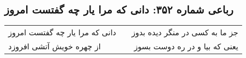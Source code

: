 \begin{center}
\section*{رباعی شماره ۳۵۲: دانی که مرا یار چه گفتست امروز}
\label{sec:sh352}
\begin{longtable}{l p{0.5cm} r}
دانی که مرا یار چه گفتست امروز
&&
جز ما به کسی در منگر دیده بدوز
\\
از چهره خویش آتشی افروزد
&&
یعنی که بیا و در ره دوست بسوز
\\
\end{longtable}
\end{center}
